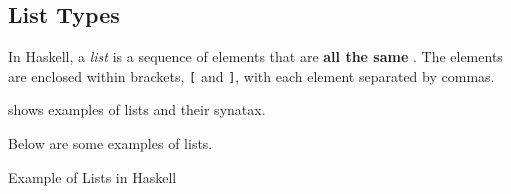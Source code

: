 \subsection{List Types}\label{subsec:List_Types}
\begin{definition}[List]\label{def:List}
  In Haskell, a \emph{list} is a sequence of elements that are \textbf{all the same }.
  The elements are enclosed within brackets, \texttt{[} and \texttt{]}, with each element separated by commas.

   shows examples of lists and their synatax.
\end{definition}

Below are some examples of lists.
\begin{listing}[h!tbp]
\caption{Example of Lists in Haskell}
\label{lst:List_Examples}
\end{listing}



